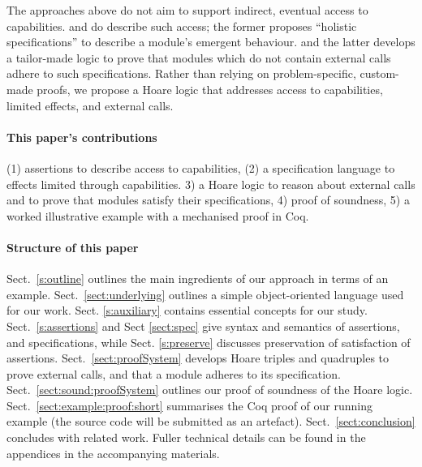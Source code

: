  The approaches above %
 do not aim to support indirect, eventual access to capabilities.
\citet{FASE} and \citet{OOPSLA22} do describe such access; %
  the former proposes  ``holistic specifications'' to describe a module's emergent behaviour. 
and the latter develops 
a tailor-made logic to prove that modules which do not contain external calls adhere to such specifications.
%
%
Rather than relying on problem-specific, custom-made proofs, we propose a Hoare logic that addresses access to capabilities, limited effects, and external calls.

  
\paragraph{This paper's contributions} %
{(1) assertions to describe   access to capabilities}, 
(2) a specification language to effects limited through capabilities.
3) a Hoare logic to reason about external calls and to prove that modules satisfy their %
specifications,
4)  proof of soundness,
5) a worked illustrative example {with a mechanised proof in Coq}.
 

 \paragraph{Structure of this paper}
Sect.\ \ref{s:outline}   outlines the main ingredients of our approach in terms of an {example}.
Sect.\ \ref{sect:underlying} outlines a simple object-oriented language used for our work. 
 Sect. \ref{s:auxiliary}  {contains essential concepts for our study}.
Sect.\ \ref{s:assertions} and 
 Sect \ref{sect:spec}  give syntax and semantics of assertions, and  specifications,
{while Sect. \ref{s:preserve} discusses preservation of satisfaction of assertions.}
Sect.\ \ref{sect:proofSystem} develops Hoare triples and quadruples to prove external calls, and that a module adheres to its %
 specification.
Sect.\ \ref{sect:sound:proofSystem} outlines {our} proof of soundness of
the Hoare logic. 
Sect.\ \ref{sect:example:proof:short} summarises  the Coq proof
  of  our running example (the source code will be submitted as an artefact). 
 Sect.\ \ref{sect:conclusion} concludes with related work. 
Fuller technical details can be found in the appendices in the accompanying materials. 
